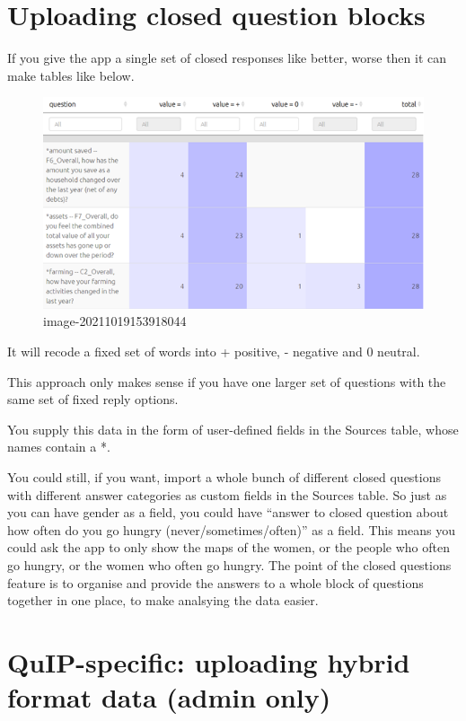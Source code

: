 \documentclass[
]{book}
\begin{document}
\hypertarget{uploading-closed-question-blocks}{%
\section{Uploading closed question blocks}\label{uploading-closed-question-blocks}}

If you give the app a single set of closed responses like better, worse then it can make tables like below.

\begin{figure}
\centering
\includegraphics[width=6.77083in,height=\textheight]{_assets/image-20211019153918044.png}
\caption{image-20211019153918044}
\end{figure}

It will recode a fixed set of words into + positive, - negative and 0 neutral.

This approach only makes sense if you have one larger set of questions with the same set of fixed reply options.

You supply this data in the form of user-defined fields in the Sources table, whose names contain a *.

You could still, if you want, import a whole bunch of different closed questions with different answer categories as custom fields in the Sources table. So just as you can have gender as a field, you could have ``answer to closed question about how often do you go hungry (never/sometimes/often)'' as a field. This means you could ask the app to only show the maps of the women, or the people who often go hungry, or the women who often go hungry. The point of the closed questions feature is to organise and provide the answers to a whole block of questions together in one place, to make analsying the data easier.

\hypertarget{ximport-hybrid}{%
\section{QuIP-specific: uploading hybrid format data (admin only)}\label{ximport-hybrid}}
\end{document}
